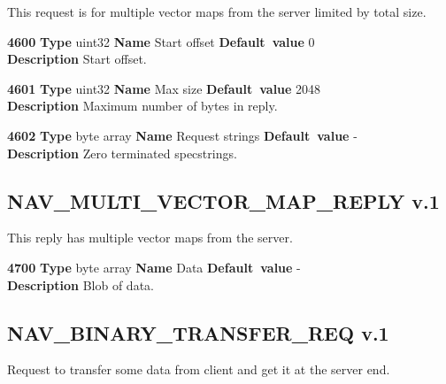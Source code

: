 \documentclass[a4paper]{article}
\begin{document}
This request is for multiple vector maps from the server limited by total size.

\begin{list}{\textbf{ParamID}}{}
\item \textbf{4600} \textbf{Type} uint32 \textbf{Name} Start offset
                 \textbf{Default~value} 0 \\
  \label{Start offset}
  \textbf{Description} Start offset.
\item \textbf{4601} \textbf{Type} uint32 \textbf{Name} Max size
                 \textbf{Default~value} 2048 \\
  \label{Max size}
  \textbf{Description} Maximum number of bytes in reply.
\item \textbf{4602} \textbf{Type} byte array \textbf{Name} Request strings
                 \textbf{Default~value} - \\
  \label{Request strings}
  \textbf{Description} Zero terminated specstrings.
\end{list}


\subsection{NAV\_MULTI\_VECTOR\_MAP\_REPLY v.1}

This reply has multiple vector maps from the server.

\begin{list}{\textbf{ParamID}}{}
\item \textbf{4700} \textbf{Type} byte array \textbf{Name} Data
                 \textbf{Default~value} - \\
  \textbf{Description} Blob of data.
\end{list}


\subsection{NAV\_BINARY\_TRANSFER\_REQ v.1}

Request to transfer some data from client and get it at the server end.
\end{document}
